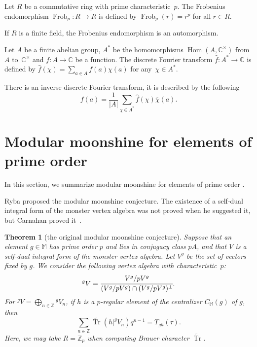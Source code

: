 \documentclass[10pt,a4paper]{amsart}
\numberwithin{equation}{section}
\newtheorem{Theorem}{Theorem}[section]
\begin{document}
\begin{Definition}
Let $R$ be a commutative ring with prime characteristic~$p$. The Frobenius endomorphism $\operatorname{Frob}_p\colon R\rightarrow R$ is defined by $\operatorname{Frob}_p(r)=r^p$ for all $r\in R$.
\end{Definition}

If $R$ is a finite field, the Frobenius endomorphism is an automorphism.

\begin{Definition}
Let $A$ be a finite abelian group, $A^*$ be the homomorphisms $\operatorname{Hom}(A,\mathbb{C}^\times)$ from~$A$ to~$\mathbb{C}^\times$ and $f\colon A \rightarrow \mathbb{C}$ be a function. The discrete Fourier transform $\hat{f}\colon A^*\rightarrow \mathbb{C}$ is defined by $\hat{f}(\chi)=\sum_{a \in A}f(a)\chi (a)$ for any~$\chi \in A^*$.
\end{Definition}

There is an inverse discrete Fourier transform, it is described by the following
\[
f(a)=\frac{1}{|A|}\sum_{\chi \in A^*}\hat{f}(\chi)\overline{\chi}(a).
\]

\section{Modular moonshine for elements of prime order}\label{section3}

In this section, we summarize modular moonshine for elements of prime order \cite{B98,BR}.

Ryba proposed the modular moonshine conjecture. The existence of a self-dual integral form of the monster vertex algebra was not proved when he suggested it, but Carnahan proved it~\cite{C}.

\begin{Theorem}[the original modular moonshine conjecture]
Suppose that an element $g \in \mathbb{M}$ has prime order $p$ and lies in conjugacy class $pA$, and that $V$ is a self-dual integral form of the monster vertex algebra.
Let $V^g$ be the set of vectors fixed by $g$. We consider the following vertex algebra with characteristic~$p$:
 \[
{}^{g}V=\cfrac{V^g/pV^g}{(V^g/pV^g) \cap (V^g/pV^g)^{\perp}} .
\]
For $^{g}V=\bigoplus_{n \in \mathbb{Z}}{^{g}V_n}$, if $h$ is a $p$-regular element of the centralizer $C_{\mathbb{M}}(g)$ of $g$, then
\[
\sum_{n \in \mathbb{Z}} \widetilde{\operatorname{Tr}}(h|^{g}V_n)q^{n-1}=T_{gh}(\tau).
\]
 Here, we may take $R=\mathbb{Z}_p$ when computing Brauer character $\widetilde{\operatorname{Tr}}$.
 \end{Theorem}
\end{document}
